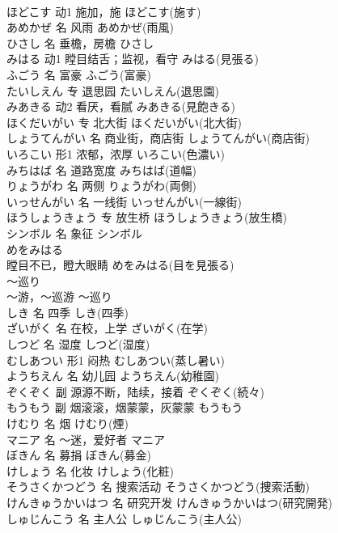 \documentclass[8pt]{extreport}
\begin{document}
\begin{CJK}{UTF8}{min}
\\	ほどこす	动1	施加，施	ほどこす(施す)	
\\	あめかぜ	名	风雨	あめかぜ(雨風)	
\\	ひさし	名	垂檐，房檐	ひさし	
\\	みはる	动1	瞠目结舌；监视，看守	みはる(見張る)	
\\	ふごう	名	富豪	ふごう(富豪)	
\\	たいしえん	专	退思园	たいしえん(退思園)	
\\	みあきる	动2	看厌，看腻	みあきる(見飽きる)	
\\	ほくだいがい	专	北大街	ほくだいがい(北大街)	
\\	しょうてんがい	名	商业街，商店街	しょうてんがい(商店街)	
\\	いろこい	形1	浓郁，浓厚	いろこい(色濃い)	
\\	みちはば	名	道路宽度	みちはば(道幅)	
\\	りょうがわ	名	两侧	りょうがわ(両側)	
\\	いっせんがい	名	一线街	いっせんがい(一線街)	
\\	ほうしょうきょう	专	放生桥	ほうしょうきょう(放生橋)	
\\	シンボル	名	象征	シンボル	
\\	めをみはる	
\\	瞠目不已，瞪大眼睛	めをみはる(目を見張る)	
\\	～巡り	
\\	～游，～巡游	～巡り	
\\	しき	名	四季	しき(四季)	
\\	ざいがく	名	在校，上学	ざいがく(在学)	
\\	しつど	名	湿度	しつど(湿度)	
\\	むしあつい	形1	闷热	むしあつい(蒸し暑い)	
\\	ようちえん	名	幼儿园	ようちえん(幼稚園)	
\\	ぞくぞく	副	源源不断，陆续，接着	ぞくぞく(続々)	
\\	もうもう	副	烟滚滚，烟蒙蒙，灰蒙蒙	もうもう	
\\	けむり	名	烟	けむり(煙)	
\\	マニア	名	～迷，爱好者	マニア	
\\	ぼきん	名	募捐	ぼきん(募金)	
\\	けしょう	名	化妆	けしょう(化粧)	
\\	そうさくかつどう	名	搜索活动	そうさくかつどう(捜索活動)	
\\	けんきゅうかいはつ	名	研究开发	けんきゅうかいはつ(研究開発)	
\\	しゅじんこう	名	主人公	しゅじんこう(主人公)	

\end{CJK}
\end{document}
